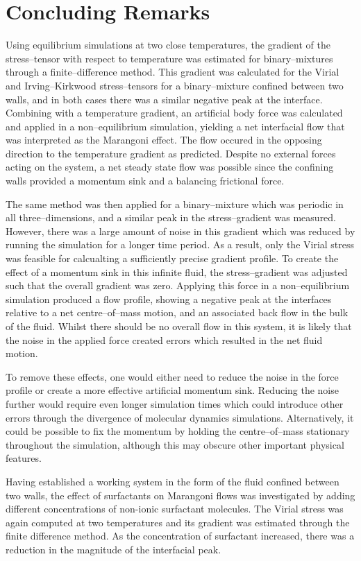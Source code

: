 \section{Concluding Remarks}
Using equilibrium simulations at two close temperatures, the gradient of the stress--tensor with respect to temperature was estimated for binary--mixtures through a finite--difference method.
This gradient was calculated for the Virial and Irving--Kirkwood stress--tensors for a binary--mixture confined between two walls, and in both cases there was a similar negative peak at the interface.
Combining with a temperature gradient, an artificial body force was calculated and applied in a non--equilibrium simulation, yielding a net interfacial flow that was interpreted as the Marangoni effect.
The flow occured in the opposing direction to the temperature gradient as predicted.
Despite no external forces acting on the system, a net steady state flow was possible since the confining walls provided a momentum sink and a balancing frictional force.

The same method was then applied for a binary--mixture which was periodic in all three--dimensions, and a similar peak in the stress--gradient was measured.
However, there was a large amount of noise in this gradient which was reduced by running the simulation for a longer time period.
As a result, only the Virial stress was feasible for calcualting a sufficiently precise gradient profile.
To create the effect of a momentum sink in this infinite fluid, the stress--gradient was adjusted such that the overall gradient was zero.
Applying this force in a non--equilibrium simulation produced a flow profile, showing a negative peak at the interfaces relative to a net centre--of--mass motion, and an associated back flow in the bulk of the fluid.
Whilst there should be no overall flow in this system, it is likely that the noise in the applied force created errors which resulted in the net fluid motion. 

To remove these effects, one would either need to reduce the noise in the force profile or create a more effective artificial momentum sink.
Reducing the noise further would require even longer simulation times which could introduce other errors through the divergence of molecular dynamics simulations.
Alternatively, it could be possible to fix the momentum by holding the centre--of--mass stationary throughout the simulation, although this may obscure other important physical features.

Having established a working system in the form of the fluid confined between two walls, the effect of surfactants on Marangoni flows was investigated by adding different concentrations of non-ionic surfactant molecules.
The Virial stress was again computed at two temperatures and its gradient was estimated through the finite difference method.
As the concentration of surfactant increased, there was a reduction in the magnitude of the interfacial peak.

